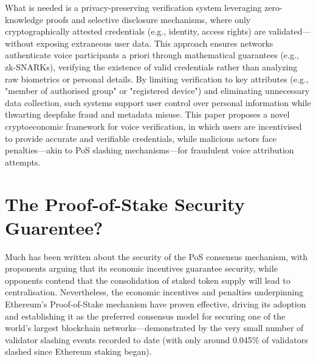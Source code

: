 \documentclass[11pt,a4paper]{article}
\begin{document}
What is needed is a privacy-preserving verification system leveraging zero-knowledge proofs and selective disclosure mechanisms, where only cryptographically attested credentials (e.g., identity, access rights) are validated—without exposing extraneous user data.
This approach ensures networks authenticate voice participants a priori through mathematical guarantees (e.g., zk-SNARKs), verifying the existence of valid credentials rather than analyzing raw biometrics or personal details.
By limiting verification to key attributes (e.g., "member of authorised group" or "registered device") and eliminating unnecessary data collection, such systems support user control over personal information while thwarting deepfake fraud and metadata misuse.
This paper proposes a novel cryptoeconomic framework for voice verification, in which users are incentivised to provide accurate and verifiable credentials, while malicious actors face penalties—akin to PoS slashing mechanisms—for fraudulent voice attribution attempts.

\section{The Proof-of-Stake Security Guarentee?}
\label{sec:background}
Much has been written about the security of the PoS consensus mechanism, with proponents arguing that its economic incentives guarantee security, while opponents contend that the consolidation of staked token supply will lead to centralisation.
Nevertheless, the economic incentives and penalties underpinning Ethereum's Proof-of-Stake mechanism have proven effective, driving its adoption and establishing it as the preferred consensus model for securing one of the world's largest blockchain networks—demonstrated by the very small number of validator slashing events recorded to date (with only around 0.045\% of validators slashed since Ethereum staking began).
\end{document}
